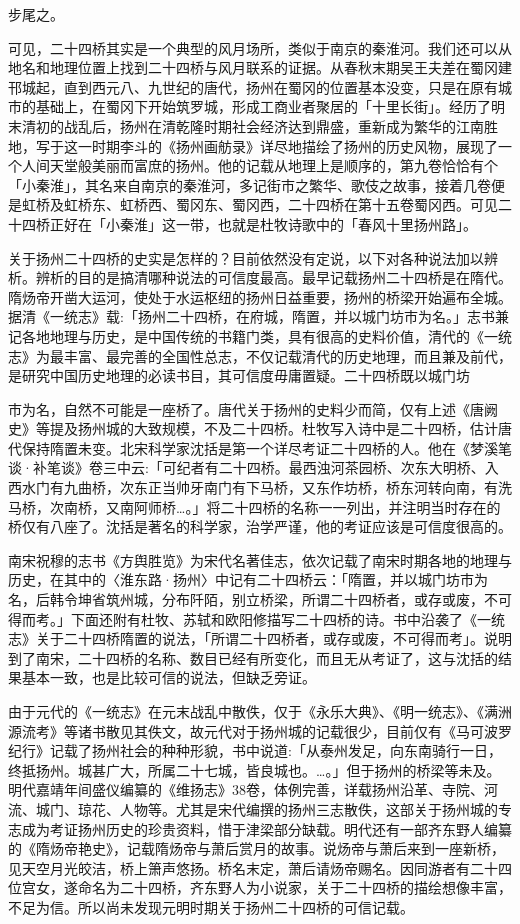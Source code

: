 步尾之。

可见，二十四桥其实是一个典型的风月场所，类似于南京的秦淮河。我们还可以从地名和地理位置上找到二十四桥与风月联系的证据。从春秋末期吴王夫差在蜀冈建邗城起，直到西元八、九世纪的唐代，扬州在蜀冈的位置基本没变，只是在原有城市的基础上，在蜀冈下开始筑罗城，形成工商业者聚居的「十里长街」。经历了明末清初的战乱后，扬州在清乾隆时期社会经济达到鼎盛，重新成为繁华的江南胜地，写于这一时期李斗的《扬州画舫录》详尽地描绘了扬州的历史风物，展现了一个人间天堂般美丽而富庶的扬州。他的记载从地理上是顺序的，第九卷恰恰有个「小秦淮」，其名来自南京的秦淮河，多记街市之繁华、歌伎之故事，接着几卷便是虹桥及虹桥东、虹桥西、蜀冈东、蜀冈西，二十四桥在第十五卷蜀冈西。可见二十四桥正好在「小秦淮」这一带，也就是杜牧诗歌中的「春风十里扬州路」。


关于扬州二十四桥的史实是怎样的？目前依然没有定说，以下对各种说法加以辨析。辨析的目的是搞清哪种说法的可信度最高。最早记载扬州二十四桥是在隋代。隋炀帝开凿大运河，使处于水运枢纽的扬州日益重要，扬州的桥梁开始遍布全城。据清《一统志》载:「扬州二十四桥，在府城，隋置，并以城门坊市为名。」志书兼记各地地理与历史，是中国传统的书籍门类，具有很高的史料价值，清代的《一统志》为最丰富、最完善的全国性总志，不仅记载清代的历史地理，而且兼及前代，是研究中国历史地理的必读书目，其可信度毋庸置疑。二十四桥既以城门坊


\noindent 市为名，自然不可能是一座桥了。唐代关于扬州的史料少而简，仅有上述《唐阙史》等提及扬州城的大致规模，不及二十四桥。杜牧写入诗中是二十四桥，估计唐代保持隋置未变。北宋科学家沈括是第一个详尽考证二十四桥的人。他在《梦溪笔谈·补笔谈》卷三中云:「可纪者有二十四桥。最西浊河茶园桥、次东大明桥、入西水门有九曲桥，次东正当帅牙南门有下马桥，又东作坊桥，桥东河转向南，有洗马桥，次南桥，又南阿师桥…。」将二十四桥的名称一一列出，并注明当时存在的桥仅有八座了。沈括是著名的科学家，治学严谨，他的考证应该是可信度很高的。

南宋祝穆的志书《方舆胜览》为宋代名著佳志，依次记载了南宋时期各地的地理与历史，在其中的〈淮东路·扬州〉中记有二十四桥云：「隋置，并以城门坊市为名，后韩令坤省筑州城，分布阡陌，别立桥梁，所谓二十四桥者，或存或废，不可得而考。」下面还附有杜牧、苏轼和欧阳修描写二十四桥的诗。书中沿袭了《一统志》关于二十四桥隋置的说法，「所谓二十四桥者，或存或废，不可得而考」。说明到了南宋，二十四桥的名称、数目已经有所变化，而且无从考证了，这与沈括的结果基本一致，也是比较可信的说法，但缺乏旁证。

由于元代的《一统志》在元末战乱中散佚，仅于《永乐大典》、《明一统志》、《满洲源流考》等诸书散见其佚文，故元代对于扬州城的记载很少，目前仅有《马可波罗纪行》记载了扬州社会的种种形貌，书中说道:「从泰州发足，向东南骑行一日，终抵扬州。城甚广大，所属二十七城，皆良城也。…。」但于扬州的桥梁等未及。明代嘉靖年间盛仪编纂的《维扬志》38卷，体例完善，详载扬州沿革、寺院、河流、城门、琼花、人物等。尤其是宋代编撰的扬州三志散佚，这部关于扬州城的专志成为考证扬州历史的珍贵资料，惜于津梁部分缺载。明代还有一部齐东野人编纂的《隋炀帝艳史》，记载隋炀帝与萧后赏月的故事。说炀帝与萧后来到一座新桥，见天空月光皎洁，桥上箫声悠扬。桥名末定，萧后请炀帝赐名。因同游者有二十四位宫女，遂命名为二十四桥，齐东野人为小说家，关于二十四桥的描绘想像丰富，不足为信。所以尚未发现元明时期关于扬州二十四桥的可信记载。

